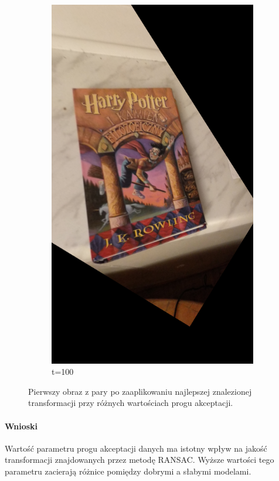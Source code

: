 \documentclass{article}
\begin{document}
\begin{figure}[H]
\begin{subfigure}[b]{0.3\linewidth}
			\includegraphics[width=\linewidth]{p100t.png}
			\caption{t=100}
		\end{subfigure}
		\caption{Pierwszy obraz z pary po zaaplikowaniu najlepszej znalezionej transformacji przy różnych wartościach progu akceptacji.}
		\label{fig:thresh2}
	\end{figure}
	
	\paragraph{Wnioski}
	Wartość parametru progu akceptacji danych ma istotny wpływ na jakość transformacji znajdowanych przez metodę RANSAC. Wyższe wartości tego parametru zacierają różnice pomiędzy dobrymi a słabymi modelami.
\end{document}
